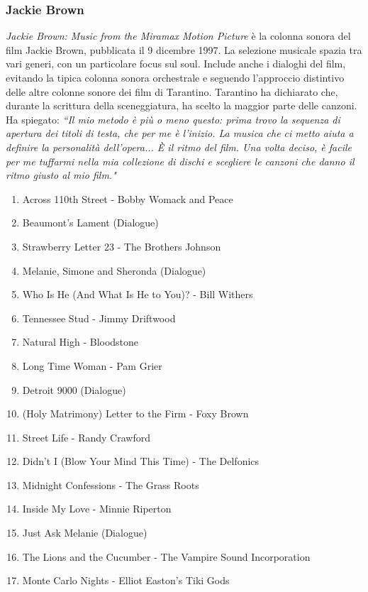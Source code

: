 \documentclass[12pt]{article} %
\begin{document}
            \subsubsection*{Jackie Brown}
            \begin{flushleft}
            \textit{Jackie Brown: Music from the Miramax Motion Picture} è la colonna sonora del film Jackie Brown, pubblicata il 9 dicembre 1997. La selezione musicale spazia tra vari generi, con un particolare focus sul soul. Include anche i dialoghi del film, evitando la tipica colonna sonora orchestrale e seguendo l'approccio distintivo delle altre colonne sonore dei film di Tarantino. 
            Tarantino ha dichiarato che, durante la scrittura della sceneggiatura, ha scelto la maggior parte delle canzoni. Ha spiegato: \textit{``Il mio metodo è più o meno questo: prima trovo la sequenza di apertura dei titoli di testa, che per me è l'inizio. La musica che ci metto aiuta a definire la personalità dell'opera... È il ritmo del film. Una volta deciso, è facile per me tuffarmi nella mia collezione di dischi e scegliere le canzoni che danno il ritmo giusto al mio film."}
            \end{flushleft}
                \small
                \begin{enumerate}
                    \item Across 110th Street - Bobby Womack and Peace
                    \item Beaumont's Lament (Dialogue)
                    \item Strawberry Letter 23 - The Brothers Johnson
                    \item Melanie, Simone and Sheronda (Dialogue)
                    \item Who Is He (And What Is He to You)? - Bill Withers
                    \item Tennessee Stud - Jimmy Driftwood
                    \item Natural High - Bloodstone
                    \item Long Time Woman - Pam Grier
                    \item Detroit 9000 (Dialogue)
                    \item (Holy Matrimony) Letter to the Firm - Foxy Brown
                    \item Street Life - Randy Crawford
                    \item Didn't I (Blow Your Mind This Time) - The Delfonics
                    \item Midnight Confessions - The Grass Roots
                    \item Inside My Love - Minnie Riperton
                    \item Just Ask Melanie (Dialogue)
                    \item The Lions and the Cucumber - The Vampire Sound Incorporation
                    \item Monte Carlo Nights - Elliot Easton's Tiki Gods
                \end{enumerate}
                \break
\end{document}
